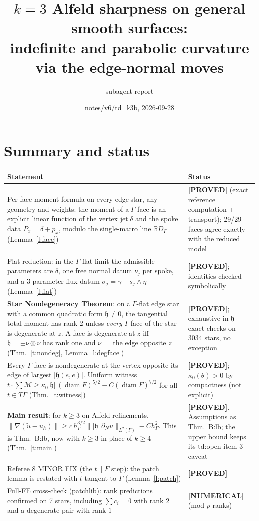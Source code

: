 \documentclass[11pt]{article}
\title{$k=3$ Alfeld sharpness on general smooth surfaces:\\ \large indefinite and parabolic curvature via the edge-normal moves}
\author{subagent report}
\date{notes/v6/td\_k3b, 2026-09-28}
\theoremstyle{definition}
\newcommand{\R}{\mathbb R}
\newcommand{\hG}{h_\Gamma}
\newcommand{\M}{\mathcal M}
\newcommand{\hh}{\mathfrak h}
\newcommand{\norm}[1]{\lVert #1\rVert}
\DeclareMathOperator{\diam}{diam}
\newcommand{\status}[1]{\textbf{[#1]}}
\begin{document}
\maketitle

\section*{Summary and status}
\begin{center}
\begin{tabular}{p{}p{}}
\toprule
Statement & Status\\
\midrule
Per-face moment formula on every edge star, any geometry and weights: the moment of a $\Gamma$-face is an explicit linear function of the vertex jet $\delta$ and the spoke data $P_x=\delta+p_x$, modulo the single-macro line $\R D_F$ (Lemma~\ref{l:face}) & \status{PROVED} (exact reference computation + transport); 29/29 faces agree exactly with the reduced model\\
Flat reduction: in the $\Gamma$-flat limit the admissible parameters are $\delta$, one free normal datum $\nu_j$ per spoke, and a 3-parameter flux datum $\sigma_j=\gamma-s_j\wedge\eta$ (Lemma~\ref{l:flat}) & \status{PROVED}; identities checked symbolically\\
\textbf{Star Nondegeneracy Theorem}: on a $\Gamma$-flat edge star with a common quadratic form $\hh\neq0$, the tangential total moment has rank $2$ unless \emph{every} $\Gamma$-face of the star is degenerate at $z$. A face is degenerate at $z$ iff $\hh=\pm\nu\otimes\nu$ has rank one and $\nu\perp$ the edge opposite $z$ (Thm.~\ref{t:nondeg}, Lemma~\ref{l:degface}) & \status{PROVED}; exhaustive-in-$\hh$ exact checks on 3034 stars, no exception\\
Every $\Gamma$-face is nondegenerate at the vertex opposite its edge of largest $|\hh(e,e)|$. Uniform witness $t\cdot\sum\M\ge\kappa_0|\hh|\,(\diam F)^{5/2}-C(\diam F)^{7/2}$ for all $t\in T\Gamma$ (Thm.~\ref{t:witness}) & \status{PROVED}; $\kappa_0(\theta)>0$ by compactness (not explicit)\\
\textbf{Main result}: for $k\ge3$ on Alfeld refinements, $\norm{\nabla(\tilde u-u_h)}\ge c\,\hG^{3/2}\norm{|\hh|\,\partial_Nu}_{L^2(\Gamma)}-C\hG^2$. This is Thm.~B:lb, now with $k\ge3$ in place of $k\ge4$ (Thm.~\ref{t:main}) & \status{PROVED}. Assumptions as Thm.~B:lb; the upper bound keeps its td:open item 3 caveat\\
Referee 8 MINOR FIX (the $t\parallel F$ step): the patch lemma is restated with $t$ tangent to $\Gamma$ (Lemma~\ref{l:patch}) & \status{PROVED}\\
Full-FE cross-check (patchlib): rank predictions confirmed on 7 stars, including $\sum c_i=0$ with rank $2$ and a degenerate pair with rank $1$ & \status{NUMERICAL} (mod-$p$ ranks)\\
\bottomrule
\end{tabular}
\end{center}
\end{document}
